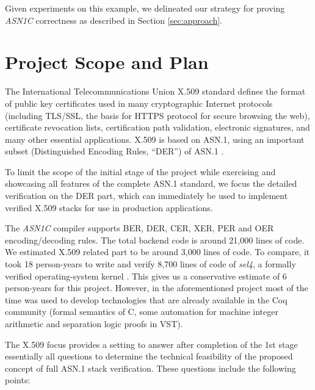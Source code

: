 \documentclass[10p,conference]{IEEEtran}
\begin{document}
Given experiments on this example, we delineated our strategy for proving
\emph{ASN1C} correctness as described in Section \ref{sec:approach}.

\section{Project Scope and Plan}

The International Telecommunications Union X.509 standard
\cite{X509} defines the format of public key certificates used in
many cryptographic Internet protocols (including TLS/SSL, the basis
for HTTPS protocol for secure browsing the web), certificate
revocation lists, certification path validation, electronic
signatures, and many other essential applications. X.509 is based on
ASN.1, using an important subset (Distinguished
Encoding Rules, ``DER'') of ASN.1 \cite{BERandDER}.

To limit the scope of the initial stage of the project while
exercising and showcasing all features of the complete ASN.1
standard, we focus the detailed verification on the DER part,
which can immediately be used to implement verified X.509
stacks for use in production applications.

The \emph{ASN1C} compiler supports BER, DER, CER, XER, PER and OER encoding/decoding rules. The total backend code is around 21,000 lines of code. We estimated X.509 related part to be around 3,000 lines of code. To compare, it took 18 person-years to write and verify 8,700 lines of code of \emph{sel4}, a formally verified operating-system kernel \cite{VNSSforSel4}. This gives us a conservative estimate of 6 person-years for this project. However, in the aforementioned project most of the time was used to develop technologies that are already available in the Coq community (formal semantics of C, some automation for machine integer arithmetic and separation logic proofs in VST). 

The X.509 focus provides a setting to answer after completion of the
1st stage essentially all questions
to determine the technical feasibility of the
proposed concept of full ASN.1 stack verification. These questions
include the following points:
\end{document}
